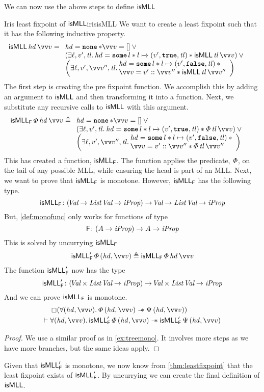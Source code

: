 \documentclass[thesis.tex]{subfiles}
\begin{document}
We can now use the above steps to define $\textsf{\upshape isMLL}$
\begin{example}{Iris least fixpoint of $\textsf{\upshape isMLL}$}{irisisMLL}
  We want to create a least fixpoint such that it has the following inductive property.
  \begin{align*}
    \isMLL\, \hd\, \vect{\val} & = \isMLLRecDef
  \end{align*}
  The first step is creating the pre fixpoint function. We accomplish this by adding an argument to $\textsf{\upshape isMLL}$ and then transforming it into a function. Next, we substitute any recursive calls to $\textsf{\upshape isMLL}$ with this argument.
  \begin{align*}
    \isMLL_\hopred\, \pred\, \hd\, \vect{v} & \eqdef
    \isMLLFDef
  \end{align*}
  This has created a function, $\textsf{\upshape isMLL}_{\textsf{\upshape F}}$. The function applies the predicate, $\varPhi$, on the tail of any possible MLL, while ensuring the head is part of an MLL. Next, we want to prove that $\textsf{\upshape isMLL}_{\textsf{\upshape F}}$ is monotone. However, $\textsf{\upshape isMLL}_{\textsf{\upshape F}}$ has the following type.
  \[\textsf{\upshape isMLL}_{\textsf{\upshape F}}\colon (\kern-0.2em\textit{Val} \to \textit{List}\ \kern-0.2em\textit{Val} \to \textit{iProp}) \to \kern-0.2em\textit{Val} \to \textit{List}\ \kern-0.2em\textit{Val} \to \textit{iProp}\]
  But, \cref{def:monofunc} only works for functions of type
  \[\textsf{\upshape F}\colon (A \to \textit{iProp}) \to A \to \textit{iProp}\]
  This is solved by uncurrying $\textsf{\upshape isMLL}_{\textsf{\upshape F}}$
  \begin{align*}
    \isMLL'_\hopred\, \pred\, (\hd, \vect{\val}) \eqdef \isMLL_\hopred\, \pred\, \hd\, \vect{\val}
  \end{align*}
  The function $\textsf{\upshape isMLL}'_{\textsf{\upshape F}}$ now has the type
  \[\textsf{\upshape isMLL}'_{\textsf{\upshape F}}\colon (\kern-0.2em\textit{Val} \times \textit{List}\ \kern-0.2em\textit{Val} \to \textit{iProp}) \to  \kern-0.2em\textit{Val} \times \textit{List}\ \kern-0.2em\textit{Val} \to \textit{iProp}\]
  And we can prove $\textsf{\upshape isMLL}_{\textsf{\upshape F}}$ is monotone.
  \begin{align*}
              & \always(\All(\hd, \vect{\val}). \pred\,(\hd, \vect{\val}) \wand \predB\,(\hd, \vect{\val}))                              \\
    \proves{} & \All(\hd, \vect{\val}). \isMLL'_\hopred\, \pred\, (\hd, \vect{\val}) \wand \isMLL'_\hopred\, \predB\, (\hd, \vect{\val})
  \end{align*}
  \begin{proof}
    We use a similar proof as in \cref{ex:treemono}. It involves more steps as we have more branches, but the same ideas apply.
  \end{proof}
  Given that $\textsf{\upshape isMLL}'_{\textsf{\upshape F}}$ is monotone, we now know from \cref{thm:leastfixpoint} that the least fixpoint exists of $\textsf{\upshape isMLL}'_{\textsf{\upshape F}}$. By uncurrying we can create the final definition of $\textsf{\upshape isMLL}$.

\end{example}
\end{document}
